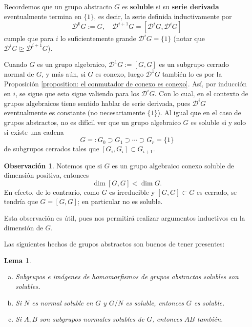 \documentclass[spanish,10pt]{amsart}
\newtheorem{lemma}[theorem]{Lema}
\theoremstyle{definition}
\newtheorem{obs}[theorem]{Observación}
\theoremstyle{remark}
\numberwithin{equation}{section}
\begin{document}
Recordemos que un grupo abstracto $G$ es \textbf{soluble} si su \textbf{serie derivada} eventualmente termina en $\{1\}$, es decir, la serie definida inductivamente por
\[
    \mathcal D ^0 G :=G, \quad \mathcal D^{i + 1} G = [\mathcal D ^i G, \mathcal D^i G]
\]
cumple que para $i$ lo suficientemente grande $\mathcal D^i G = \{1\}$ (notar que $\mathcal D ^i G \unrhd \mathcal D^{i + 1} G$).

Cuando $G$ es un grupo algebraico, $\mathcal D^1 G := [G,G]$ es un subgrupo cerrado normal de $G$, y más aún, si $G$ es conexo, luego $\mathcal D^1 G$ también lo es por la Proposición \ref{proposition: el conmutador de conexo es conexo}. Así, por inducción en $i$, se sigue que esto sigue valiendo para los $\mathcal D^i G$. Con lo cual, en el contexto de grupos algebraicos tiene sentido hablar de serie derivada, pues $\mathcal D^i G$ eventualmente es constante (no necesariamente $\{1\}$). Al igual que en el caso de grupos abstractos, no es difícil ver que un grupo algebraico $G$ es soluble si y solo si existe una cadena
\[
    G =: G_0 \supset G_1 \supset \cdots \supset G_r = \{1\}
\]
de subgrupos cerrados tales que $[G_i,G_i] \subset G_{i+1}$.

\begin{obs}
Notemos que si $G$ es un grupo algebraico conexo soluble de dimensión positiva, entonces
\[
    \dim [G,G] < \dim G.
\]
En efecto, de lo contrario, como $G$ es irreducible y $[G,G] \subset G$ es cerrado, se tendría que $G = [G,G]$; en particular no es soluble.
\end{obs}
Esta observación es útil, pues nos permitirá realizar argumentos inductivos en la dimensión de $G$.

Las siguientes hechos de grupos abstractos son buenos de tener presentes:
\begin{lemma}
\begin{enumerate}[(a)]
\item Subgrupos e imágenes de homomorfismos de grupos abstractos solubles son solubles.
\item Si $N$ es normal soluble en $G$ y $G/N$ es soluble, entonces $G$ es soluble.
\item Si $A,B$ son subgrupos normales solubles de $G$, entonces $AB$ también.
\end{enumerate}
\end{lemma}
\end{document}
